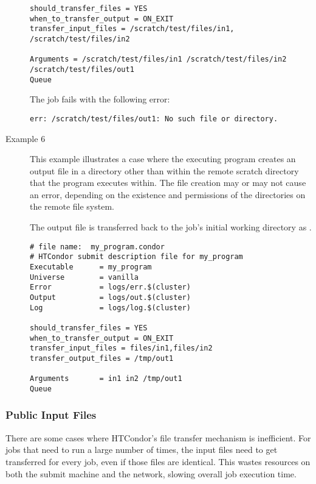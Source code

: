 \begin{description}
\begin{verbatim}
should_transfer_files = YES
when_to_transfer_output = ON_EXIT
transfer_input_files = /scratch/test/files/in1, /scratch/test/files/in2

Arguments = /scratch/test/files/in1 /scratch/test/files/in2 /scratch/test/files/out1
Queue
\end{verbatim}
\normalsize

The job fails with the following error:
\footnotesize
\begin{verbatim}
err: /scratch/test/files/out1: No such file or directory.
\end{verbatim}
\normalsize

\item[Example 6]

This example illustrates a case
where the executing program creates an output file in a directory
other than within the remote scratch directory that the 
program executes within.
The file creation may or may not cause an error,
depending on the existence and permissions
of the directories on the remote file system.

The output file  is transferred back to the job's
initial working directory as .

\footnotesize
\begin{verbatim}
# file name:  my_program.condor
# HTCondor submit description file for my_program
Executable      = my_program
Universe        = vanilla
Error           = logs/err.$(cluster)
Output          = logs/out.$(cluster)
Log             = logs/log.$(cluster)

should_transfer_files = YES
when_to_transfer_output = ON_EXIT
transfer_input_files = files/in1,files/in2
transfer_output_files = /tmp/out1

Arguments       = in1 in2 /tmp/out1
Queue
\end{verbatim}
\normalsize

\end{description}

\subsubsection{\label{sec:public-input-files}Public Input Files}
There are some cases where HTCondor's file transfer mechanism is inefficient.
For jobs that need to run a large number of times, the input files need to get 
transferred for every job, even if those files are identical. This wastes 
resources on both the submit machine and the network, slowing overall job 
execution time.

